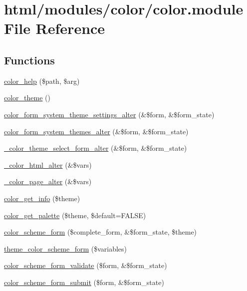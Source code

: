 \hypertarget{color_8module}{
\section{html/modules/color/color.module File Reference}
\label{color_8module}
}
\subsection*{Functions}
\begin{DoxyCompactItemize}
\item 
\hyperlink{color_8module_a93cbd893662e9825fbf0e77c4390526a}{color\_\-help} (\$path, \$arg)
\item 
\hyperlink{color_8module_ac73d7e414c063c06b7f9eaa402cbdd55}{color\_\-theme} ()
\item 
\hyperlink{color_8module_ab6f3bf4ea432ab3752304d8a3ce8355f}{color\_\-form\_\-system\_\-theme\_\-settings\_\-alter} (\&\$form, \&\$form\_\-state)
\item 
\hyperlink{color_8module_aab51ce0c8130ac6b9a89cf081321ba8a}{color\_\-form\_\-system\_\-themes\_\-alter} (\&\$form, \&\$form\_\-state)
\item 
\hyperlink{color_8module_a023d4b5a0bdf2fcb2527d6d7289d55a5}{\_\-color\_\-theme\_\-select\_\-form\_\-alter} (\&\$form, \&\$form\_\-state)
\item 
\hyperlink{color_8module_a42c1a45b4c960ed52877b8724c8c1b08}{\_\-color\_\-html\_\-alter} (\&\$vars)
\item 
\hyperlink{color_8module_a8c2fa4b2a829b46046d0c9b3603b761b}{\_\-color\_\-page\_\-alter} (\&\$vars)
\item 
\hyperlink{color_8module_aaf5fea9b55181881aa5f80d0410dccaa}{color\_\-get\_\-info} (\$theme)
\item 
\hyperlink{color_8module_a8d8c3577723eaa4e0adaa830acacff11}{color\_\-get\_\-palette} (\$theme, \$default=FALSE)
\item 
\hyperlink{group__forms_ga96d9b56f10f5a4d4178d43444732fb09}{color\_\-scheme\_\-form} (\$complete\_\-form, \&\$form\_\-state, \$theme)
\item 
\hyperlink{group__themeable_ga08f8bd750587602eebbd205d192dbe9c}{theme\_\-color\_\-scheme\_\-form} (\$variables)
\item 
\hyperlink{color_8module_a1cc79136887d4ca5fdd82e8362d78f15}{color\_\-scheme\_\-form\_\-validate} (\$form, \&\$form\_\-state)
\item 
\hyperlink{color_8module_a995f86a47f2e1456f113aa80c37b9a32}{color\_\-scheme\_\-form\_\-submit} (\$form, \&\$form\_\-state)

\end{DoxyCompactItemize}
